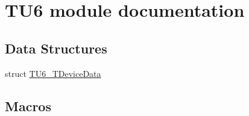 \hypertarget{group___t_u6__module}{\section{T\-U6 module documentation}
\label{group___t_u6__module}
}
\subsection*{Data Structures}
\begin{DoxyCompactItemize}
\item 
struct \hyperlink{struct_t_u6___t_device_data}{T\-U6\-\_\-\-T\-Device\-Data}
\end{DoxyCompactItemize}
\subsection*{Macros}

